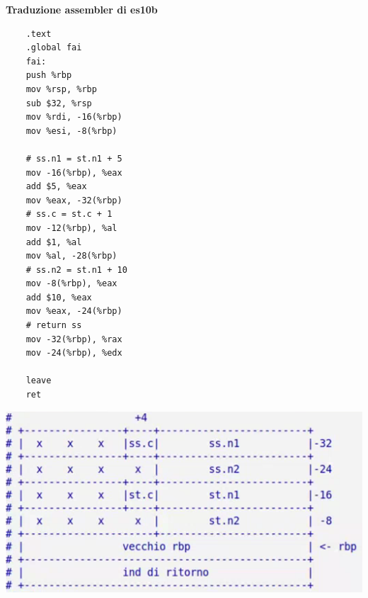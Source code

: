 \noindent \textbf{Traduzione assembler di es10b}
\begin{verbatim}
	.text
	.global fai
	fai:
	push %rbp
	mov %rsp, %rbp
	sub $32, %rsp
	mov %rdi, -16(%rbp)
	mov %esi, -8(%rbp)
	
	# ss.n1 = st.n1 + 5
	mov -16(%rbp), %eax
	add $5, %eax
	mov %eax, -32(%rbp)
	# ss.c = st.c + 1
	mov -12(%rbp), %al
	add $1, %al
	mov %al, -28(%rbp)
	# ss.n2 = st.n1 + 10
	mov -8(%rbp), %eax
	add $10, %eax
	mov %eax, -24(%rbp)
	# return ss
	mov -32(%rbp), %rax
	mov -24(%rbp), %edx
	
	leave
	ret
\end{verbatim}
\begin{center}
	\includegraphics[scale=.9]{img/31.PNG}
\end{center} 
